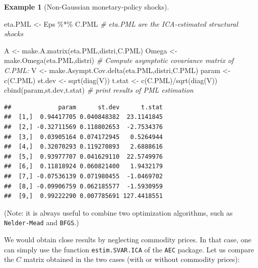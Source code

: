 \documentclass[
  12pt,
]{book}
\newenvironment{Shaded}{\begin{snugshade}}{\end{snugshade}}
\newcommand{\AttributeTok}[1]{\textcolor[rgb]{0.77,0.63,0.00}{#1}}
\newcommand{\CommentTok}[1]{\textcolor[rgb]{0.56,0.35,0.01}{\textit{#1}}}
\newcommand{\ConstantTok}[1]{\textcolor[rgb]{0.00,0.00,0.00}{#1}}
\newcommand{\DecValTok}[1]{\textcolor[rgb]{0.00,0.00,0.81}{#1}}
\newcommand{\FunctionTok}[1]{\textcolor[rgb]{0.00,0.00,0.00}{#1}}
\newcommand{\NormalTok}[1]{#1}
\newcommand{\OtherTok}[1]{\textcolor[rgb]{0.56,0.35,0.01}{#1}}
\newcommand{\SpecialCharTok}[1]{\textcolor[rgb]{0.00,0.00,0.00}{#1}}
\theoremstyle{definition}
\theoremstyle{definition}
\newtheorem{example}{Example}[chapter]
\theoremstyle{definition}
\theoremstyle{definition}
\theoremstyle{remark}
\begin{document}
\begin{example}[Non-Gaussian monetary-policy shocks]
\begin{Shaded}
\begin{Highlighting}[]
\NormalTok{eta.PML }\OtherTok{\textless{}{-}}\NormalTok{ Eps }\SpecialCharTok{\%*\%}\NormalTok{ C.PML }\CommentTok{\# eta.PML are the ICA{-}estimated structural shocks}

\NormalTok{A }\OtherTok{\textless{}{-}} \FunctionTok{make.A.matrix}\NormalTok{(eta.PML,distri,C.PML)}
\NormalTok{Omega }\OtherTok{\textless{}{-}} \FunctionTok{make.Omega}\NormalTok{(eta.PML,distri)}
\CommentTok{\# Compute asymptotic covariance matrix of C.PML:}
\NormalTok{V }\OtherTok{\textless{}{-}} \FunctionTok{make.Asympt.Cov.delta}\NormalTok{(eta.PML,distri,C.PML)}
\NormalTok{param }\OtherTok{\textless{}{-}} \FunctionTok{c}\NormalTok{(C.PML)}
\NormalTok{st.dev }\OtherTok{\textless{}{-}} \FunctionTok{sqrt}\NormalTok{(}\FunctionTok{diag}\NormalTok{(V))}
\NormalTok{t.stat }\OtherTok{\textless{}{-}} \FunctionTok{c}\NormalTok{(C.PML)}\SpecialCharTok{/}\FunctionTok{sqrt}\NormalTok{(}\FunctionTok{diag}\NormalTok{(V))}
\FunctionTok{cbind}\NormalTok{(param,st.dev,t.stat) }\CommentTok{\# print results of PML estimation}
\end{Highlighting}
\end{Shaded}

\begin{verbatim}
##             param      st.dev      t.stat
##  [1,]  0.94417705 0.040848382  23.1141845
##  [2,] -0.32711569 0.118802653  -2.7534376
##  [3,]  0.03905164 0.074172945   0.5264944
##  [4,]  0.32070293 0.119270893   2.6888616
##  [5,]  0.93977707 0.041629110  22.5749976
##  [6,]  0.11818924 0.060821400   1.9432179
##  [7,] -0.07536139 0.071980455  -1.0469702
##  [8,] -0.09906759 0.062185577  -1.5930959
##  [9,]  0.99222290 0.007785691 127.4418551
\end{verbatim}

(Note: it is always useful to combine two optimization algorithms, such as \texttt{Nelder-Mead} and \texttt{BFGS}.)

We would obtain close results by neglecting commodity prices. In that case, one can simply use the function \texttt{estim.SVAR.ICA} of the \texttt{AEC} package. Let us compare the \(C\) matrix obtained in the two cases (with or without commodity prices):

\begin{Shaded}
\end{Shaded}


\end{example}
\end{document}
